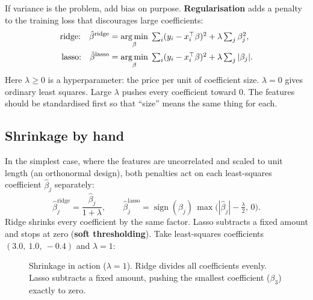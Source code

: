 If variance is the problem, add bias on purpose. \textbf{Regularisation} adds a penalty to the
training loss that discourages large coefficients:
\begin{align*}
\text{ridge:}\quad \hat\beta^{\text{ridge}} &= \operatorname*{arg\,min}_\beta\; \textstyle\sum_i (y_i - x_i^\top\beta)^2 + \lambda\sum_j \beta_j^2,\\
\text{lasso:}\quad \hat\beta^{\text{lasso}} &= \operatorname*{arg\,min}_\beta\; \textstyle\sum_i (y_i - x_i^\top\beta)^2 + \lambda\sum_j |\beta_j|.
\end{align*}
Here $\lambda\ge0$ is a hyperparameter: the price per unit of coefficient size. $\lambda=0$
gives ordinary least squares. Large $\lambda$ pushes every coefficient toward $0$. The
features should be standardised first so that ``size'' means the same thing for each.

\subsection{Shrinkage by hand}

In the simplest case, where the features are uncorrelated and scaled to unit length
(an orthonormal design), both penalties act on each least-squares coefficient
$\hat\beta_j$ separately:
\[
\hat\beta_j^{\text{ridge}} = \frac{\hat\beta_j}{1+\lambda},
\qquad
\hat\beta_j^{\text{lasso}} = \operatorname{sign}(\hat\beta_j)\,\max\!\big(|\hat\beta_j| - \tfrac{\lambda}{2},\,0\big).
\]
Ridge shrinks every coefficient by the same factor. Lasso subtracts a fixed amount and stops at
zero (\textbf{soft thresholding}). Take least-squares coefficients $(3.0,\ 1.0,\ -0.4)$ and
$\lambda=1$:

\begin{figure}[H]
\centering
{}
\caption{Shrinkage in action ($\lambda=1$). Ridge divides all coefficients evenly. Lasso subtracts a fixed amount, pushing the smallest coefficient ($\beta_3$) exactly to zero.}
\label{fig:ml-shrink-bars}
\end{figure}

